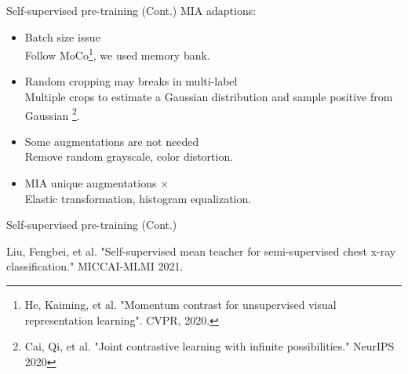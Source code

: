 \documentclass[handout]{beamer}
\begin{document}
\begin{frame}{Self-supervised pre-training (Cont.)}
    MIA adaptions:
    \begin{itemize}
        \item Batch size issue \checkmark \\
        Follow MoCo\footnote[5]{\tiny He, Kaiming, et al. "Momentum contrast for unsupervised visual representation learning". CVPR, 2020.}, we used memory bank.
        \item Random cropping may breaks in multi-label \checkmark \\
        Multiple crops to estimate a Gaussian distribution and sample positive from Gaussian \footnote[6]{\tiny Cai, Qi, et al. "Joint contrastive learning with infinite possibilities." NeurIPS 2020}.
        \item Some augmentations are not needed \checkmark \\
        Remove random grayscale, color distortion.
        \item MIA unique augmentations $\times$ \\
        Elastic transformation, histogram equalization. 
    \end{itemize}
\end{frame}

\begin{frame}{Self-supervised pre-training (Cont.)}
    \begin{table}[t!]
        \centering
        \caption{Mean AUC result over the 14 disease classes of Chest X-Ray14 for different label set training percentages. * indicates the methods that use Densenet169 as backbone architecture. Rest are Densetnet121. 
        }
        \label{tab:main}
        \end{table}
        \small Liu, Fengbei, et al. "Self-supervised mean teacher for semi-supervised chest x-ray classification." MICCAI-MLMI 2021.
\end{frame}
\end{document}
